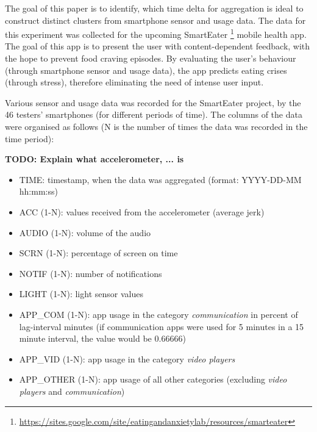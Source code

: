 

The goal of this paper is to identify, which time delta for aggregation is ideal to construct distinct clusters from smartphone sensor and usage data. The data for this experiment was collected for the upcoming SmartEater \footnote{\url{https://sites.google.com/site/eatingandanxietylab/resources/smarteater}} mobile health app. The goal of this app is to present the user with content-dependent feedback, with the hope to prevent food craving episodes. By evaluating the user's behaviour (through smartphone sensor and usage data), the app predicts eating crises (through stress), therefore eliminating the need of intense user input. 



Various sensor and usage data was recorded for the SmartEater project, by the 46 testers' smartphones (for different periods of time). The columns of the data were organised as follows (N is the number of times the data was recorded in the time period):
 
\textbf{TODO: Explain what accelerometer, ... is}

\begin{itemize}
	\item TIME: timestamp, when the data was aggregated (format: YYYY-DD-MM hh:mm:ss)
	\item ACC (1-N): values received from the accelerometer (average jerk)
	\item AUDIO (1-N): volume of the audio 
	\item SCRN (1-N): percentage of screen on time
	\item NOTIF (1-N): number of notifications
	\item LIGHT (1-N): light sensor values
	\item APP\_COM (1-N): app usage in the category \textit{communication} in percent of lag-interval minutes (if communication apps were used for 5 minutes in a 15 minute interval, the value would be 0.66666)
	\item APP\_VID (1-N): app usage in the category \textit{video players}
	\item APP\_OTHER (1-N): app usage of all other categories (excluding \textit{video players} and \textit{communication})
\end{itemize}


